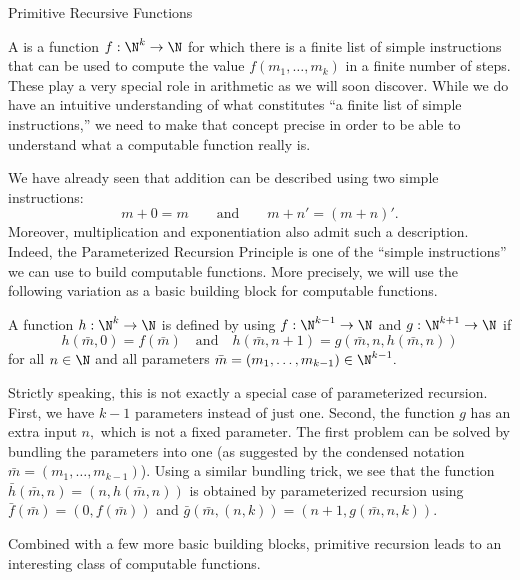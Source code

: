 \begin{unit}{Primitive Recursive Functions}

A  is a function \(f:\N^k\to\N\) for which there is a finite list of simple instructions that can be used to compute the value \(f(m_1,\dots,m_k)\) in a finite number of steps.
These play a very special role in arithmetic as we will soon discover.
While we do have an intuitive understanding of what constitutes ``a finite list of simple instructions,'' we need to make that concept precise in order to be able to understand what a computable function really is.

We have already seen that addition can be described using two simple instructions: \[m + 0 = m \qquad\text{and}\qquad m + n' = (m+n)'.\]
Moreover, multiplication and exponentiation also admit such a description.
Indeed, the Parameterized Recursion Principle is one of the ``simple instructions'' we can use to build computable functions.
More precisely, we will use the following variation as a basic building block for computable functions.

\begin{definition}\label{D:PrimitiveRecursion}
  A function \(h:\N^k\to\N\) is defined by  using \(f:\N^{k-1}\to\N\) and \(g:\N^{k+1}\to\N\) if \[h(\bar{m},0) = f(\bar{m}) \quad\text{and}\quad h(\bar{m},n+1) = g(\bar{m},n,h(\bar{m},n))\] for all \(n \in \N\) and all parameters \(\bar{m} = (m_1,\dots,m_{k-1}) \in \N^{k-1}.\)
\end{definition}

\noindent
Strictly speaking, this is not exactly a special case of parameterized recursion.
First, we have \(k-1\) parameters instead of just one.
Second, the function \(g\) has an extra input \(n,\) which is not a fixed parameter.
The first problem can be solved by bundling the parameters into one (as suggested by the condensed notation \(\bar{m} = (m_1,\dots,m_{k-1})\)).
Using a similar bundling trick, we see that the function \(\bar{h}(\bar{m},n) = (n,h(\bar{m},n))\) is obtained by parameterized recursion using \(\bar{f}(\bar{m}) = (0,f(\bar{m}))\) and \(\bar{g}(\bar{m},(n,k)) = (n+1,g(\bar{m},n,k)).\)

Combined with a few more basic building blocks, primitive recursion leads to an interesting class of computable functions.


\end{unit}
